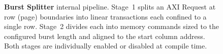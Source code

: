 \documentclass[12pt,a4paper]{article}
\begin{document}
\begin{figure}[H]
\begin{tikzpicture}
\end{tikzpicture}

\caption{%
  \textbf{Burst Splitter} internal pipeline.
  Stage~1 splits an AXI Request at row (page) boundaries into
  linear transactions each confined to a single row.
  Stage~2 divides each into memory commands sized to the configured
  burst length and aligned to the start column address.
  Both stages are individually enabled or disabled at compile time.
}
\label{fig:burst-splitter}
\end{figure}
\end{document}
